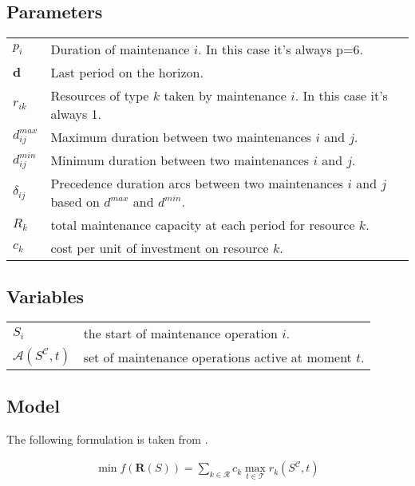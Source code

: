 \documentclass[a4paper,11pt]{article}
\begin{document}
    \subsection{Parameters}

    \begin{tabular}{ll}
        $p_i$ & Duration of maintenance $i$. In this case it's always p=6.\\
        $\mathbf{d}$ & Last period on the horizon.\\
        $r_{ik}$ & Resources of type $k$ taken by maintenance $i$. In this case it's always 1.\\
        $d^{max}_{ij}$ & Maximum duration between two maintenances $i$ and $j$.\\
        $d^{min}_{ij}$ & Minimum duration between two maintenances $i$ and $j$.\\
        ${\delta}_{ij}$ & Precedence duration arcs between two maintenances $i$ and $j$ based on $d^{max}$ and $d^{min}$.\\
        $R_k$ & total maintenance capacity at each period for resource $k$.\\
        $c_k$ & cost per unit of investment on resource $k$.
    \end{tabular}

    \subsection{Variables}

    \begin{tabular}{ll}
        $S_i$ & the start of maintenance operation $i$.\\
        $\mathcal{A}(S^{\mathcal{C}}, t)$ & set of maintenance operations active at moment $t$.\\
    \end{tabular}

    \subsection{Model}

    The following formulation is taken from \cite{Neumann2000}.

    \begin{align}
        \min f(\mathbf{R}(S)) = \sum_{k \in \mathcal{R}} c_k \max_{t \in \mathcal{T}} r_k(S^{\mathcal{C}}, t)
    \end{align}
\end{document}
